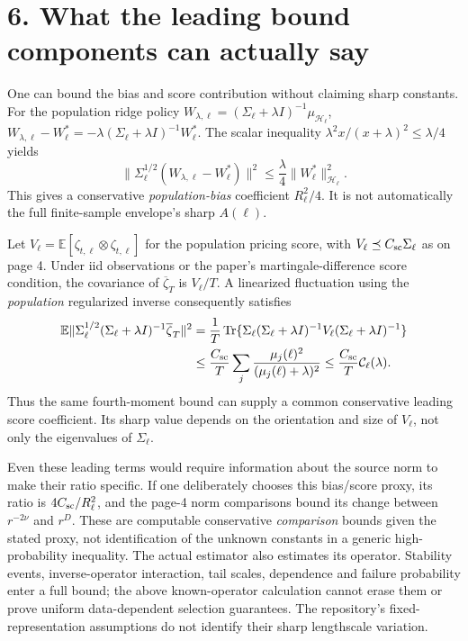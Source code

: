 \documentclass[11pt,letterpaper]{article}
\newcommand{\Hh}{\mathcal H}
\newcommand{\E}{\mathbb E}
\newcommand{\C}{\mathcal C}
\newcommand{\Tr}{\operatorname{Tr}}
\begin{document}
\newpage
\section*{6. What the leading bound components can actually say}
One can bound the bias and score contribution without claiming sharp constants.
For the population ridge policy
$W_{\lambda,\ell}=(\Sigma_\ell+\lambda I)^{-1}\mu_{\Hh_\ell}$,
$W_{\lambda,\ell}-W_\ell^*=-\lambda(\Sigma_\ell+\lambda I)^{-1}W_\ell^*$.
The scalar inequality $\lambda^2x/(x+\lambda)^2\leq\lambda/4$ yields
\[
 \|\Sigma_\ell^{1/2}(W_{\lambda,\ell}-W_\ell^*)\|^2
 \leq\frac{\lambda}{4}\|W_\ell^*\|_{\Hh_\ell}^2.
\]
This gives a conservative \emph{population-bias} coefficient $R_\ell^2/4$.
It is not automatically the full finite-sample envelope's sharp $A(\ell)$.

Let $V_\ell=\E[\zeta_{t,\ell}\otimes\zeta_{t,\ell}]$ for the population
pricing score, with $V_\ell\preceq C_{\rm sc}\Sigma_\ell$ as on page 4.
Under iid observations or the paper's martingale-difference score condition,
the covariance of $\overline\zeta_T$ is $V_\ell/T$. A linearized fluctuation
using the \emph{population} regularized inverse consequently satisfies
\begin{align*}
 \E\|\Sigma_\ell^{1/2}(\Sigma_\ell+\lambda I)^{-1}
                 \overline\zeta_T\|^2
 &=\frac1T\Tr\{\Sigma_\ell(\Sigma_\ell+\lambda I)^{-1}
                      V_\ell(\Sigma_\ell+\lambda I)^{-1}\}\\
 &\leq\frac{C_{\rm sc}}{T}\sum_j
       \frac{\mu_j(\ell)^2}{(\mu_j(\ell)+\lambda)^2}
 \leq\frac{C_{\rm sc}}{T}\C_\ell(\lambda).
\end{align*}
Thus the same fourth-moment bound can supply a common conservative leading
score coefficient. Its sharp value depends on the orientation and size of
$V_\ell$, not only the eigenvalues of $\Sigma_\ell$.

Even these leading terms would require information about the source norm to
make their ratio specific. If one deliberately chooses this bias/score proxy,
its ratio is $4C_{\rm sc}/R_\ell^2$, and the page-4 norm comparisons bound its
change between $r^{-2\nu}$ and $r^D$. These are computable conservative
\emph{comparison} bounds given the stated proxy, not identification of the
unknown constants in a generic high-probability inequality. The actual estimator
also estimates its operator. Stability events, inverse-operator interaction,
tail scales, dependence and failure probability enter a full bound; the above
known-operator calculation cannot erase them or prove uniform data-dependent
selection guarantees. The repository's fixed-representation assumptions do not
identify their sharp lengthscale variation.
\end{document}
